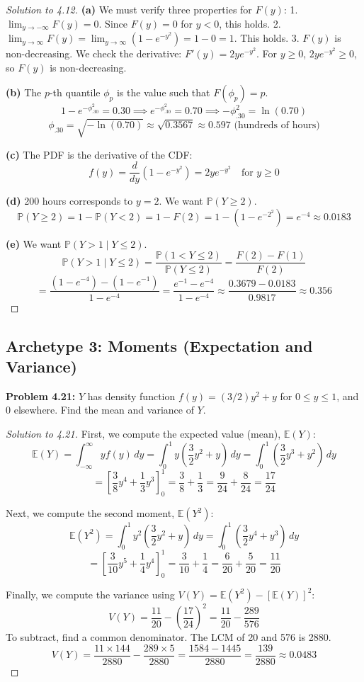 \documentclass[11pt, a4paper]{article}
\theoremstyle{definition}
\theoremstyle{remark}
\newcommand{\E}{\mathbb{E}}
\newcommand{\Prob}{\mathbb{P}}
\begin{document}
\begin{proof}[Solution to 4.12]
\textbf{(a)} We must verify three properties for $F(y)$:
1. $\lim_{y \to -\infty} F(y) = 0$. Since $F(y) = 0$ for $y < 0$, this holds.
2. $\lim_{y \to \infty} F(y) = \lim_{y \to \infty} (1 - e^{-y^2}) = 1 - 0 = 1$. This holds.
3. $F(y)$ is non-decreasing. We check the derivative: $F'(y) = 2y e^{-y^2}$. For $y \ge 0$, $2y e^{-y^2} \ge 0$, so $F(y)$ is non-decreasing.

\textbf{(b)} The $p$-th quantile $\phi_p$ is the value such that $F(\phi_p) = p$.
\[ 1 - e^{-\phi_{.30}^2} = 0.30 \implies e^{-\phi_{.30}^2} = 0.70 \implies -\phi_{.30}^2 = \ln(0.70) \]
\[ \phi_{.30} = \sqrt{-\ln(0.70)} \approx \sqrt{0.3567} \approx 0.597 \text{ (hundreds of hours)} \]

\textbf{(c)} The PDF is the derivative of the CDF:
\[ f(y) = \frac{d}{dy} \left( 1 - e^{-y^2} \right) = 2y e^{-y^2} \quad \text{for } y \ge 0 \]

\textbf{(d)} 200 hours corresponds to $y = 2$. We want $\Prob(Y \ge 2)$.
\[ \Prob(Y \ge 2) = 1 - \Prob(Y < 2) = 1 - F(2) = 1 - (1 - e^{-2^2}) = e^{-4} \approx 0.0183 \]

\textbf{(e)} We want $\Prob(Y > 1 \mid Y \le 2)$.
\[ \Prob(Y > 1 \mid Y \le 2) = \frac{\Prob(1 < Y \le 2)}{\Prob(Y \le 2)} = \frac{F(2) - F(1)}{F(2)} \]
\[ = \frac{(1 - e^{-4}) - (1 - e^{-1})}{1 - e^{-4}} = \frac{e^{-1} - e^{-4}}{1 - e^{-4}} \approx \frac{0.3679 - 0.0183}{0.9817} \approx 0.356 \]
\end{proof}

\subsection{Archetype 3: Moments (Expectation and Variance)}

\textbf{Problem 4.21:} $Y$ has density function $f(y) = (3/2)y^2 + y$ for $0 \le y \le 1$, and $0$ elsewhere. Find the mean and variance of $Y$.

\begin{proof}[Solution to 4.21]
First, we compute the expected value (mean), $\E(Y)$:
\[ \E(Y) = \int_{-\infty}^{\infty} y f(y) \, dy = \int_{0}^{1} y \left( \frac{3}{2}y^2 + y \right) \, dy = \int_{0}^{1} \left( \frac{3}{2}y^3 + y^2 \right) \, dy \]
\[ = \left[ \frac{3}{8}y^4 + \frac{1}{3}y^3 \right]_{0}^{1} = \frac{3}{8} + \frac{1}{3} = \frac{9}{24} + \frac{8}{24} = \frac{17}{24} \]

Next, we compute the second moment, $\E(Y^2)$:
\[ \E(Y^2) = \int_{0}^{1} y^2 \left( \frac{3}{2}y^2 + y \right) \, dy = \int_{0}^{1} \left( \frac{3}{2}y^4 + y^3 \right) \, dy \]
\[ = \left[ \frac{3}{10}y^5 + \frac{1}{4}y^4 \right]_{0}^{1} = \frac{3}{10} + \frac{1}{4} = \frac{6}{20} + \frac{5}{20} = \frac{11}{20} \]

Finally, we compute the variance using $V(Y) = \E(Y^2) - [\E(Y)]^2$:
\[ V(Y) = \frac{11}{20} - \left( \frac{17}{24} \right)^2 = \frac{11}{20} - \frac{289}{576} \]
To subtract, find a common denominator. The LCM of 20 and 576 is 2880.
\[ V(Y) = \frac{11 \times 144}{2880} - \frac{289 \times 5}{2880} = \frac{1584 - 1445}{2880} = \frac{139}{2880} \approx 0.0483 \]
\end{proof}
\end{document}
